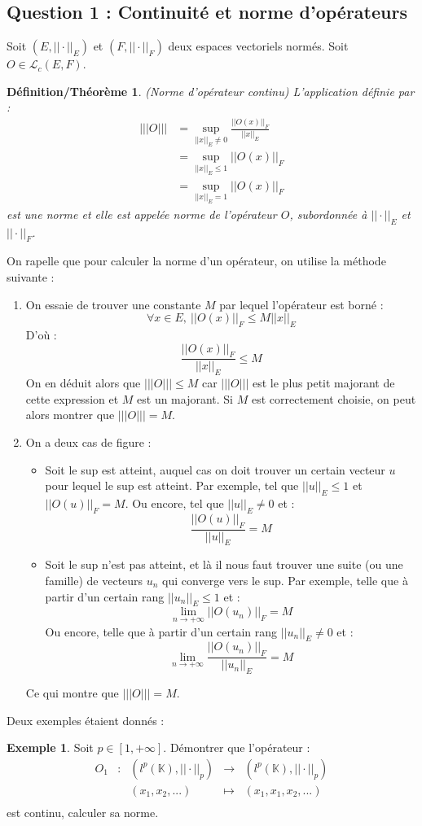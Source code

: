 \documentclass[a4paper,11pt]{article}
\theoremstyle{plain}
\newtheorem*{defith}{Définition/Théorème}
\theoremstyle{definition}
\newtheorem*{expl}{Exemple}
\begin{document}
\subsection*{Question 1 : Continuité et norme d'opérateurs}
Soit $\left(E,||\cdot||_E\right)$ et $\left(F,||\cdot||_F\right)$ deux espaces vectoriels normés.
Soit $O \in \mathcal{L}_c\left(E,F\right)$.
\begin{defith} (Norme d'opérateur continu)
L'application définie par :
\[\begin{aligned}
	|||O||| & = \sup_{||x||_E \neq 0} \frac{||O(x)||_F}{||x||_E} \\
			& = \sup_{||x||_E \leq 1} ||O(x)||_F\\
			& = \sup_{||x||_E = 1} ||O(x)||_F
\end{aligned}
\]
est une norme et elle est appelée norme de l'opérateur $O$, subordonnée à $||\cdot||_E$ et $||\cdot||_F$.
\end{defith}
On rapelle que pour calculer la norme d'un opérateur, on utilise la méthode suivante :
\begin{enumerate}
\item On essaie de trouver une constante $M$ par lequel l'opérateur est borné :
\[
	\forall x \in E, \ ||O(x)||_F \leq M||x||_E
\]
D'où :
\[
	\frac{||O(x)||_F}{||x||_E} \leq M
\]
On en déduit alors que $|||O||| \leq M$ car $|||O|||$ est le plus petit majorant de cette expression et $M$ est un majorant.
Si $M$ est correctement choisie, on peut alors montrer que $|||O||| = M$.
\item On a deux cas de figure : 
\begin{itemize}
\item Soit le sup est atteint, auquel cas on doit trouver un certain vecteur $u$ pour lequel le sup est atteint.
Par exemple, tel que $||u||_E \leq 1$ et $||O(u)||_F = M$.
Ou encore, tel que $||u||_E \neq 0$ et :
\[
	\frac{||O(u)||_F}{||u||_E} = M
\]
\item Soit le sup n'est pas atteint, et là il nous faut trouver une suite (ou une famille) de vecteurs $u_n$ qui converge vers le sup.
Par exemple, telle que à partir d'un certain rang $||u_n||_E \leq 1$ et :
\[
	\lim_{n \to +\infty} ||O(u_n)||_F = M
\]
Ou encore, telle que à partir d'un certain rang $||u_n||_E \neq 0$ et :
\[
	\lim_{n \to +\infty} \frac{||O(u_n)||_F}{||u_n||_E} = M
\]
\end{itemize}
Ce qui montre que $|||O||| = M$.
\end{enumerate}

Deux exemples étaient donnés :
\begin{expl}
Soit $p \in [1, +\infty]$.
Démontrer que l'opérateur :
\[\begin{array}{ccccc}
O_1 & : & \left(l^p\left(\mathbb{K}\right), ||\cdot||_p\right) &\longrightarrow  & \left(l^p\left(\mathbb{K}\right), ||\cdot||_p\right)\\
	& & (x_1,x_2, ...) &\longmapsto& (x_1, x_1,x_2, ...)\\
\end{array}\] 
est continu, calculer sa norme.
\end{expl}
\end{document}
